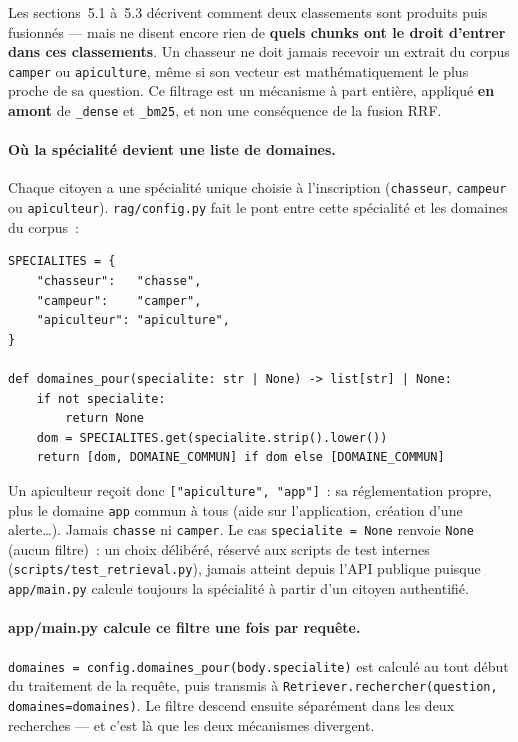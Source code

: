 \documentclass[11pt]{article}
\begin{document}
Les sections~5.1 à~5.3 décrivent comment deux classements sont produits puis fusionnés --- mais ne
disent encore rien de \textbf{quels chunks ont le droit d'entrer dans ces classements}. Un
chasseur ne doit jamais recevoir un extrait du corpus \texttt{camper} ou \texttt{apiculture}, même
si son vecteur est mathématiquement le plus proche de sa question. Ce filtrage est un mécanisme à
part entière, appliqué \textbf{en amont} de \texttt{\_dense} et \texttt{\_bm25}, et non une
conséquence de la fusion RRF.

\paragraph{Où la spécialité devient une liste de domaines.}
Chaque citoyen a une spécialité unique choisie à l'inscription (\texttt{chasseur},
\texttt{campeur} ou \texttt{apiculteur}). \texttt{rag/config.py} fait le pont entre cette
spécialité et les domaines du corpus~:

\begin{verbatim}
SPECIALITES = {
    "chasseur":   "chasse",
    "campeur":    "camper",
    "apiculteur": "apiculture",
}

def domaines_pour(specialite: str | None) -> list[str] | None:
    if not specialite:
        return None
    dom = SPECIALITES.get(specialite.strip().lower())
    return [dom, DOMAINE_COMMUN] if dom else [DOMAINE_COMMUN]
\end{verbatim}

Un apiculteur reçoit donc \texttt{["apiculture", "app"]}~: sa réglementation propre, plus le
domaine \texttt{app} commun à tous (aide sur l'application, création d'une alerte\ldots). Jamais
\texttt{chasse} ni \texttt{camper}. Le cas \texttt{specialite = None} renvoie \texttt{None} (aucun
filtre)~: un choix délibéré, réservé aux scripts de test internes (\texttt{scripts/test\_retrieval.py}),
jamais atteint depuis l'API publique puisque \texttt{app/main.py} calcule toujours la spécialité à
partir d'un citoyen authentifié.

\paragraph{app/main.py calcule ce filtre une fois par requête.}
\texttt{domaines = config.domaines\_pour(body.specialite)} est calculé au tout début du
traitement de la requête, puis transmis à \texttt{Retriever.rechercher(question,
domaines=domaines)}. Le filtre descend ensuite séparément dans les deux recherches --- et c'est là
que les deux mécanismes divergent.
\end{document}
